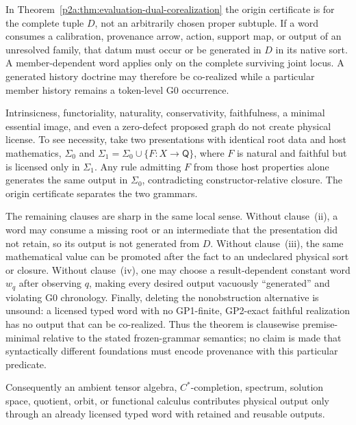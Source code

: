 \documentclass[12pt,a4paper]{article}
\begin{document}
\begin{corollary}
\label{p2a:cor:g0-witness-transport-multiroot-boundary}
In Theorem~\ref{p2a:thm:evaluation-dual-corealization} the origin certificate is for the complete tuple
\(D\), not an arbitrarily chosen proper subtuple.  If a word consumes a
calibration, provenance arrow, action, support map, or output of an unresolved
family, that datum must occur or be generated in \(D\) in its native sort.  A
member-dependent word applies only on the complete surviving joint locus.  A
generated history doctrine may therefore be co-realized while a particular
member history remains a token-level G0 occurrence.
\end{corollary}

\begin{remark}
\label{p2a:rem:g0-witness-transport-firewall}
Intrinsicness, functoriality, naturality, conservativity, faithfulness, a
minimal essential image, and even a zero-defect proposed graph do not create
physical license.  To see necessity, take two presentations with identical
root data and host mathematics, \(\Sigma_0\) and
\(\Sigma_1=\Sigma_0\cup\{F:X\to\mathsf Q\}\), where \(F\) is natural and
faithful but is licensed only in \(\Sigma_1\).  Any rule admitting \(F\) from
those host properties alone generates the same output in \(\Sigma_0\),
contradicting constructor-relative closure.  The origin certificate separates
the two grammars.

The remaining clauses are sharp in the same local sense.  Without
clause~(ii), a word may consume a missing root or an intermediate that the
presentation did not retain, so its output is not generated from \(D\).
Without clause~(iii), the same mathematical value can be promoted after the
fact to an undeclared physical sort or closure.  Without clause~(iv), one may
choose a result-dependent constant word \(w_q\) after observing \(q\), making
every desired output vacuously “generated” and violating G0 chronology.
Finally, deleting the nonobstruction alternative is unsound: a licensed typed
word with no GP1-finite, GP2-exact faithful realization has no output that can
be co-realized.  Thus the theorem is clausewise premise-minimal relative to
the stated frozen-grammar semantics; no claim is made that syntactically
different foundations must encode provenance with this particular predicate.

Consequently an ambient tensor algebra, \(C^*\)-completion,
spectrum, solution space, quotient, orbit, or functional calculus contributes
physical output only through an already licensed typed word with retained and
reusable outputs.
\end{remark}
\end{document}
